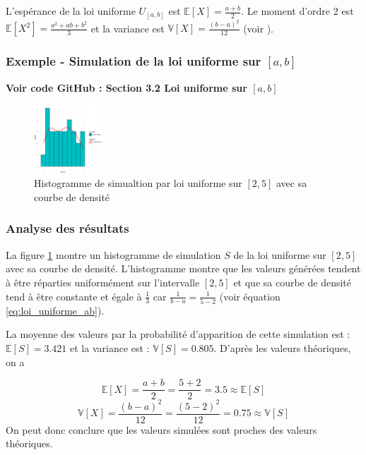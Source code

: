         L’espérance de la loi uniforme $U_{[a,b]}$ est $\mathbb{E}[X]=\frac{a+b}{2}$. Le moment d’ordre 2 est $\mathbb{E}[X^2]=\frac{a^2+ab+b^2}{3}$ et la variance est $\mathbb{V}[X]=\frac{(b-a)^2}{12}$ (voir \cite{loi_uniforme}).

        \subsubsection{Exemple - Simulation de la loi uniforme sur $[a,b]$}
        \textbf{Voir code GitHub \cite{git} : Section 3.2 Loi uniforme sur $[a,b]$}

        \begin{figure}[H]
            \centering
            \includegraphics[width=0.23\textwidth]{4_attachments/figures/output9.png}
            \caption{Histogramme de simualtion par loi uniforme sur $[2,5]$ avec sa courbe de densité}
            \label{fig:histogramme_uniforme_ab}
        \end{figure}

        \subsubsection{Analyse des résultats}
        La figure \ref{fig:histogramme_uniforme_ab} montre un histogramme de simulation $S$ de la loi uniforme sur $[2,5]$ avec sa courbe de densité. 
        L'histogramme montre que les valeurs générées tendent à être réparties uniformément sur l'intervalle $[2,5]$ et que sa courbe de densité tend à être constante et égale à $\frac{1}{3}$ car $\frac{1}{b-a} = \frac{1}{5-2}$ (voir équation \ref{eq:loi_uniforme_ab}).       
        
        La moyenne des valeurs par la probabilité d'apparition de cette simulation est : $\mathbb{E}[S] = 3.421$ et la variance est : $\mathbb{V}[S] = 0.805$. D'après les valeurs théoriques, on a 
        
        \[
        \mathbb{E}[X] = \frac{a+b}{2} = \frac{5+2}{2} = 3.5 \approx \mathbb{E}[S]
        \]
        \[
        \mathbb{V}[X] = \frac{(b-a)^2}{12} = \frac{(5-2)^2}{12} = 0.75 \approx \mathbb{V}[S]
        \]
        On peut donc conclure que les valeurs simulées sont proches des valeurs théoriques.



